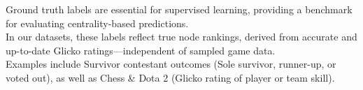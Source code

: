\documentclass[preview]{standalone}
\begin{document}
Ground truth labels are essential for supervised learning, providing a benchmark for evaluating centrality-based predictions.\\In our datasets, these labels reflect true node rankings, derived from accurate and up-to-date Glicko ratings—independent of sampled game data.\\Examples include Survivor contestant outcomes (Sole survivor, runner-up, or voted out), as well as Chess \& Dota 2 (Glicko rating of player or team skill).\\
\end{document}
